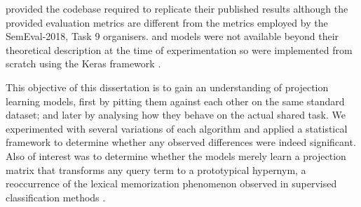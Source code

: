 \citeauthor{ustalov2017negative} provided the codebase required to replicate their published results although the provided evaluation metrics are different from the metrics employed by the SemEval-2018, Task 9 organisers.  \citep{yamane2016distributional} and \citep{bernier2018crim} models were not available beyond their theoretical description at the time of experimentation so were implemented from scratch using the Keras framework \citep{chollet2015keras}.

This objective of this dissertation is to gain an understanding of projection learning models, first by pitting them against each other on the same standard dataset; and later by analysing how they behave on the actual shared task.  We experimented with several variations of each algorithm and applied a statistical framework to determine whether any observed differences were indeed significant.  Also of interest was to determine whether the models merely learn a projection matrix that transforms any query term to a prototypical hypernym, a reoccurrence of the lexical memorization phenomenon observed in supervised classification methods \citep{levy2015supervised}.
